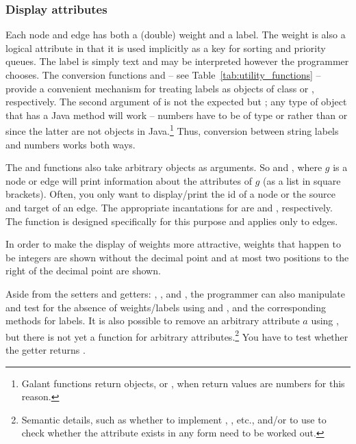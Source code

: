 \subsubsection{Display attributes} \label{sec:display_attributes}

Each node and edge has
both a (double) weight and a label.
The weight
is also a logical
attribute in that
it is used implicitly as a
key for
sorting and priority queues.
The label is simply text and may be interpreted however the programmer
chooses.
The conversion functions 
and 
-- see Table~\ref{tab:utility_functions}
-- provide a convenient mechanism for treating labels as objects of class
 or , respectively.
The second argument of 
is not the expected 
but ;
any type of object that has a Java  method will work
-- numbers have to be of type  or 
rather than  or  since the latter are not objects
in Java.\footnote{
  Galant functions return objects,  or , when
  return values are numbers for this reason.
}
Thus, conversion between string labels and numbers works both ways.

The  and  functions also take arbitrary objects as
arguments. So  and , where $g$ is a node
or edge will print information about the attributes of $g$ (as a list in
square brackets). Often, you only want to display/print the id of a node or
the source and target of an edge. The appropriate incantations for
 are  and ,
respectively. The  function is designed specifically for this
purpose and applies only to edges.

In order to make the display of weights more attractive, weights that happen
to be integers are shown without the decimal point and at most two positions
to the right of the decimal point are shown.

Aside from the setters and getters: ,
\mbox{}, 
and \mbox{}, the programmer can also
manipulate and test for the absence of weights/labels using
 and ,
and the corresponding methods for labels.
It is also possible to remove an arbitrary attribute $a$ using
, but there is not yet a  function for
arbitrary attributes.\footnote{Semantic details, such as whether to implement
  , , etc., and/or to use
   to check whether the attribute exists in any form need
    to be worked out.
}
You have to test whether the getter returns .

